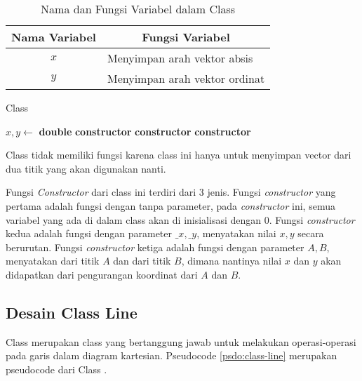 \begin{table}[htb]
	\Centering
	\caption{Nama dan Fungsi Variabel dalam Class }
	\begin{tabular}{|c|p{7cm}|}
	\hline
	Nama Variabel & \multicolumn{1}{c|}{Fungsi Variabel}                               \\ \hline
$x$           & Menyimpan arah vektor absis  \\ \hline
$y$           & Menyimpan arah vektor ordinat          \\ \hline
	\end{tabular}
	\label{tab:var-vec}
\end{table}
\begin{algorithm}
	\caption{Class }
	\label{psdo:class-vec}
	\begin{algorithmic}[1]
        \State $ x, y \leftarrow $ \textbf{double}
		\State \textbf{constructor} 
        \State \textbf{constructor} 
        \State \textbf{constructor} 
	\end{algorithmic}
\end{algorithm}

Class  tidak memiliki fungsi karena class ini hanya untuk menyimpan vector dari dua titik yang akan digunakan nanti.

Fungsi \textit{Constructor} dari class ini terdiri dari 3 jenis. Fungsi \textit{constructor} yang pertama adalah fungsi dengan tanpa parameter, pada \textit{constructor} ini, semua variabel yang ada di dalam class  akan di inisialisasi dengan $0$. Fungsi \textit{constructor} kedua adalah fungsi dengan parameter $\_x, \_y$, menyatakan nilai $x, y$ secara berurutan. Fungsi \textit{constructor} ketiga adalah fungsi dengan parameter $A, B$, menyatakan  dari titik $A$ dan  dari titik $B$, dimana nantinya nilai $x$ dan $y$ akan didapatkan dari pengurangan koordinat dari  $A$ dan  $B$.

\subsection{ Desain Class Line}
\label{sec:line}
Class  merupakan class yang bertanggung jawab untuk melakukan operasi-operasi pada garis dalam diagram kartesian. Pseudocode \ref{psdo:class-line} merupakan pseudocode dari Class . 

